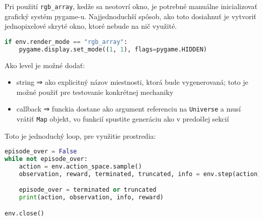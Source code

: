 Pri použití \texttt{rgb\_array}, kedže sa neotovrí okno, je potrebné manuálne inicializovať grafický systém pygame-u. Najjednoduchší spôsob, ako toto dosiahnuť je vytvoriť jednopixelové skryté okno, ktoré nebude na nič využité.

\begin{lstlisting}[language=python]
if env.render_mode == "rgb_array":
    pygame.display.set_mode((1, 1), flags=pygame.HIDDEN)
\end{lstlisting}

Ako level je možné dodať:

\begin{itemize}
    \item string ⇒ ako explicitný názov miestnosti, ktorá bude vygenerovaná; toto je možné použiť pre testovanie konkrétnej mechaniky
    \item callback ⇒ funckia dostane ako argument referenciu na \texttt{Universe} a musí vrátiť \texttt{Map} objekt, vo funkcií spustite generáciu ako v predošlej sekcií
\end{itemize}

Toto je jednoduchý loop, pre využitie prostredia:

\begin{lstlisting}[language=python]
episode_over = False
while not episode_over:
    action = env.action_space.sample()
    observation, reward, terminated, truncated, info = env.step(action)

    episode_over = terminated or truncated
    print(action, observation, info, reward)

env.close()
\end{lstlisting}



